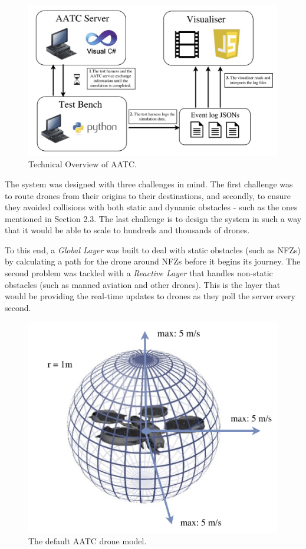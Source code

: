 \documentclass[a4paper,11pt,titlepage]{report}
\begin{document}
\begin{figure}[!hbpt]
  \center
  \includegraphics[width=\linewidth]{img/aatc_tech_overview.jpg}
  \caption{Technical Overview of AATC. \cite{Balaji2017}}
  \label{fig:aatc_tech_overview}
\end{figure}

The system was designed with three challenges in mind. The first challenge was to route drones from their origins to their destinations, and secondly, to ensure they avoided collisions with both static and dynamic obstacles - such as the ones mentioned in Section 2.3. The last challenge is to design the system in such a way that it would be able to scale to hundreds and thousands of drones.

\clearpage
To this end, a \textit{Global Layer} was built to deal with static obstacles (such as NFZs) by calculating a path for the drone around NFZs before it begins its journey. The second problem was tackled with a \textit{Reactive Layer} that handles non-static obstacles (such as manned aviation and other drones). This is the layer that would be providing the real-time updates to drones as they poll the server every second. \\

\begin{figure}[!hbpt]
  \center
  \includegraphics[width=0.8\linewidth]{img/edrone.jpg}
  \caption{The default AATC drone model. \cite{Balaji2017}}
  \label{fig:edrone}
\end{figure}
\end{document}
